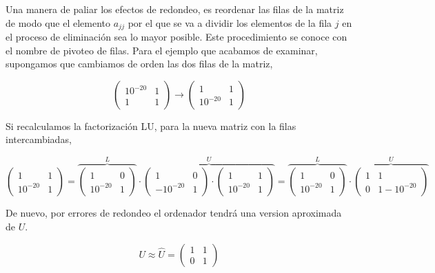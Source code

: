Una manera de paliar los efectos de redondeo, es reordenar las filas de la matriz de modo que el elemento $a_{jj}$ por el que se va a dividir los elementos de la fila $j$ en el proceso de eliminación sea lo mayor posible. Este procedimiento se conoce con el nombre de pivoteo de filas.
Para el ejemplo que acabamos de examinar, supongamos que cambiamos de orden las dos filas de    la matriz,

\begin{equation*}
\begin{pmatrix}
10^{-20}& 1\\
1& 1 
\end{pmatrix} \rightarrow \begin{pmatrix}
1& 1\\
10^{-20}& 1 
\end{pmatrix}
\end{equation*}

Si recalculamos la factorización LU, para la nueva matriz con la filas intercambiadas,

\begin{equation*}
\begin{pmatrix}
1& 1\\
10^{-20}& 1 
\end{pmatrix}=\overbrace{\begin{pmatrix}
1& 0\\
10^{-20}& 1 
\end{pmatrix}}^{L}\cdot \overbrace{\begin{pmatrix}
1& 0\\
-10^{-20}& 1
\end{pmatrix}\cdot \begin{pmatrix}
1& 1\\
10^{-20}& 1 
\end{pmatrix}}^{U}= \overbrace{\begin{pmatrix}
1& 0\\
10^{-20}& 1 
\end{pmatrix}}^{L} \cdot \overbrace{\begin{pmatrix}
1& 1\\
0&  1-10^{-20}
\end{pmatrix}}^{U} 
\end{equation*}

De nuevo, por errores de redondeo el ordenador tendrá una version aproximada de $U$.

\begin{equation*}
U \approx \hat{U}= \begin{pmatrix}
1& 1\\
0& 1 
\end{pmatrix} 
\end{equation*}

